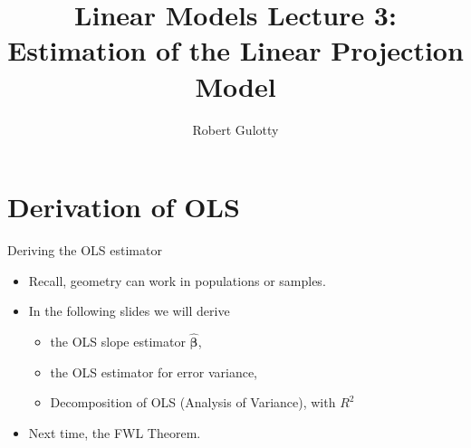 \documentclass[aspectratio=169, handout]{beamer}
\title[PLSC 30700]{Linear Models Lecture 3: Estimation of the Linear Projection Model}
\author{Robert Gulotty}
\institute[Chicago]{University of Chicago}
\numberwithin{equation}{section}
\begin{document}
\begin{frame}
\maketitle
\end{frame}





\section{Derivation of OLS}

\begin{frame}{Deriving the OLS estimator}
\begin{itemize}
\item Recall, geometry can work in populations or samples.
\item In the following slides we will derive 
\begin{itemize} 
\item the OLS slope estimator $\bm{\hat{\beta}}$,
\item the OLS estimator for error variance,
\item Decomposition of OLS (Analysis of Variance), with $R^2$
\end{itemize}
\item Next time, the FWL Theorem.
\end{itemize}
\end{frame}
\end{document}
